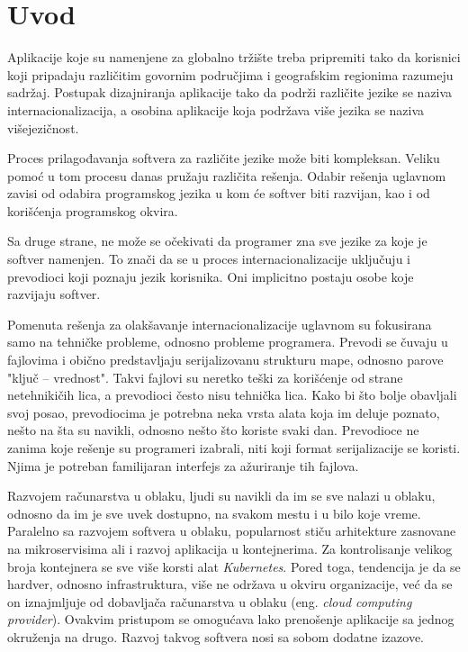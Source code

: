 \chapter{Uvod}\label{ch:uvod}

Aplikacije koje su namenjene za globalno tržište treba pripremiti 
tako da korisnici koji pripadaju različitim govornim područjima i 
geografskim regionima razumeju sadržaj. Postupak dizajniranja aplikacije 
tako da podrži različite jezike se naziva internacionalizacija, a osobina 
aplikacije koja podržava više jezika se naziva višejezičnost. 

Proces prilagođavanja softvera za različite jezike može biti kompleksan. 
Veliku pomoć u tom procesu danas pružaju različita rešenja. Odabir rešenja 
uglavnom zavisi od odabira programskog jezika u kom će softver biti 
razvijan, kao i od korišćenja programskog okvira.

Sa druge strane, ne može se očekivati da programer zna sve jezike za koje je 
softver namenjen. To znači da se u proces internacionalizacije uključuju i 
prevodioci koji poznaju jezik korisnika. Oni implicitno 
postaju osobe koje razvijaju softver.

Pomenuta rešenja za olakšavanje internacionalizacije uglavnom su fokusirana
samo na tehničke probleme, odnosno probleme programera. Prevodi se čuvaju u
fajlovima i obično predstavljaju serijalizovanu strukturu mape, odnosno parove
"ključ -- vrednost". Takvi fajlovi su neretko teški za korišćenje od strane
netehnikičih lica, a prevodioci često nisu tehnička lica. Kako bi što bolje 
obavljali svoj posao, prevodiocima je potrebna neka vrsta alata koja im deluje
poznato, nešto na šta su navikli, odnosno nešto što koriste svaki dan. 
Prevodioce ne zanima koje rešenje su programeri izabrali, niti koji format 
serijalizacije se koristi. Njima je potreban familijaran interfejs za ažuriranje
tih fajlova.

Razvojem računarstva u oblaku, ljudi su navikli da im se sve nalazi u oblaku, 
odnosno da im je sve uvek dostupno, na svakom mestu i u bilo koje vreme. 
Paralelno sa razvojem softvera u oblaku, popularnost stiču arhitekture zasnovane
na mikroservisima ali i razvoj aplikacija u kontejnerima. Za kontrolisanje 
velikog broja kontejnera se sve više korsti alat \textit{Kubernetes}. Pored toga, 
tendencija je da se hardver, odnosno infrastruktura, više ne održava u okviru
organizacije, već da se on iznajmljuje od dobavljača računarstva u oblaku 
(eng. \textit{cloud computing provider}). Ovakvim pristupom se omogućava lako 
prenošenje aplikacije sa jednog okruženja na drugo. Razvoj takvog softvera nosi
sa sobom dodatne izazove. 

